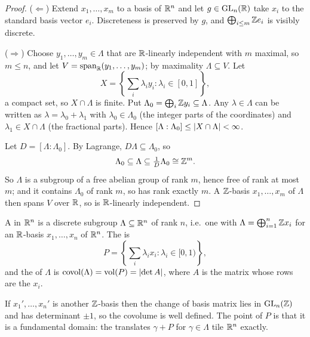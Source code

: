 \documentclass[a4paper]{scrartcl}
\newcommand{\vol}{\operatorname{vol}}
\newcommand{\covol}{\operatorname{covol}}
\begin{document}
\begin{proof}
	($\Leftarrow$) Extend $x_1, \dots, x_m$ to a basis of $\mathbb{R}^n$ and let $g \in \operatorname{GL}_n(\mathbb{R})$ take $x_i$ to the standard basis vector $e_i$. Discreteness is preserved by $g$, and $\bigoplus_{i\le m}\mathbb{Z} e_i$ is visibly discrete.

	($\Rightarrow$) Choose $y_1, \dots, y_m \in \Lambda$ that are $\mathbb{R}$-linearly independent with $m$ maximal, so $m \le n$, and let $V = \operatorname{span}_{\mathbb{R}}(y_1,\dots,y_m)$; by maximality $\Lambda \subseteq V$. Let
	$$X = \left\{\textstyle\sum_i \lambda_iy_i : \lambda_i \in [0,1]\right\},$$
	a compact set, so $X \cap \Lambda$ is finite. Put $\Lambda_0 = \bigoplus_i \mathbb{Z} y_i \subseteq \Lambda$. Any $\lambda \in \Lambda$ can be written as $\lambda = \lambda_0 + \lambda_1$ with $\lambda_0 \in \Lambda_0$ (the integer parts of the coordinates) and $\lambda_1 \in X \cap \Lambda$ (the fractional parts). Hence $[\Lambda : \Lambda_0] \le \lvert X\cap\Lambda\rvert < \infty$.

	Let $D = [\Lambda:\Lambda_0]$. By Lagrange, $D\Lambda \subseteq \Lambda_0$, so
	$$\Lambda_0 \subseteq \Lambda \subseteq \tfrac{1}{D}\Lambda_0 \cong \mathbb{Z}^m.$$
	So $\Lambda$ is a subgroup of a free abelian group of rank $m$, hence free of rank at most $m$; and it contains $\Lambda_0$ of rank $m$, so has rank exactly $m$. A $\mathbb{Z}$-basis $x_1,\dots,x_m$ of $\Lambda$ then spans $V$ over $\mathbb{R}$, so is $\mathbb{R}$-linearly independent.
\end{proof}

\begin{definition}
	A  in $\mathbb{R}^n$ is a discrete subgroup $\Lambda \subseteq \mathbb{R}^n$ of rank $n$, i.e.\ one with $\Lambda = \bigoplus_{i=1}^n \mathbb{Z} x_i$ for an $\mathbb{R}$-basis $x_1,\dots,x_n$ of $\mathbb{R}^n$. The  is
	$$P = \left\{\textstyle\sum_i\lambda_ix_i : \lambda_i \in [0,1)\right\},$$
	and the  of $\Lambda$ is $\covol(\Lambda) = \vol(P) = \abs{\det A}$, where $A$ is the matrix whose rows are the $x_i$.
\end{definition}

If $x_1',\dots,x_n'$ is another $\mathbb{Z}$-basis then the change of basis matrix lies in $\operatorname{GL}_n(\mathbb{Z})$ and has determinant $\pm1$, so the covolume is well defined. The point of $P$ is that it is a fundamental domain: the translates $\gamma + P$ for $\gamma \in \Lambda$ tile $\mathbb{R}^n$ exactly.
\end{document}
